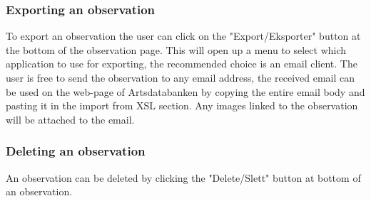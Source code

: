 \subsubsection{Exporting an observation}
To export an observation the user can click on the "Export/Eksporter" button at the bottom of the observation page.
This will open up a menu to select which application to use for exporting, the recommended choice is an email client.
The user is free to send the observation to any email address, the received email can be used on the web-page of Artsdatabanken by copying the entire email body and pasting it in the import from XSL section.
Any images linked to the observation will be attached to the email.

\subsubsection{Deleting an observation}
An observation can be deleted by clicking the "Delete/Slett" button at bottom of an observation.
